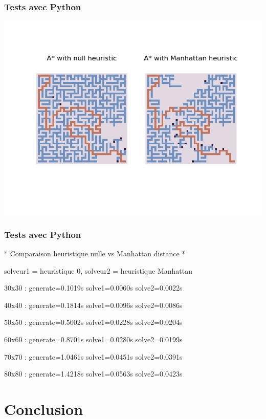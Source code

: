 \documentclass[]{beamer}
\begin{document}
\begin{frame}
  \frametitle{Tests avec Python}
  \includegraphics[width=.9\linewidth]{manhattan_vs_null.png}
\end{frame}

\begin{frame}
  \frametitle{Tests avec Python}
  \begin{semiverbatim}
    * Comparaison heuristique nulle vs Manhattan distance *
    
    solveur1 = heuristique 0, solveur2 = heuristique Manhattan
    
    30x30  : generate=0.1019s solve1=0.0060s solve2=0.0022s
    
    40x40  : generate=0.1814s solve1=0.0096s solve2=0.0086s
    
    50x50  : generate=0.5002s solve1=0.0228s solve2=0.0204s
    
    60x60  : generate=0.8701s solve1=0.0280s solve2=0.0199s
    
    70x70  : generate=1.0461s solve1=0.0451s solve2=0.0391s
    
    80x80  : generate=1.4218s solve1=0.0563s solve2=0.0423s
  \end{semiverbatim}
\end{frame}

\section{Conclusion}
\end{document}
